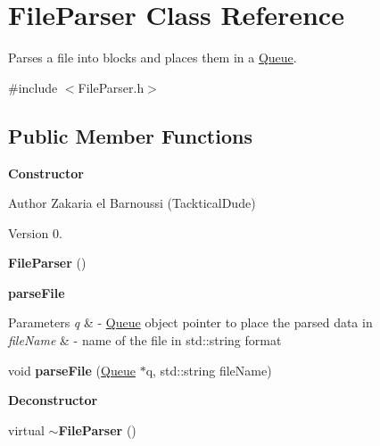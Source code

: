 \hypertarget{class_file_parser}{}\section{File\+Parser Class Reference}
\label{class_file_parser}


Parses a file into blocks and places them in a \hyperlink{class_queue}{Queue}.  




{\ttfamily \#include $<$File\+Parser.\+h$>$}

\subsection*{Public Member Functions}
\begin{Indent}{\bf Constructor}\par
{\em \begin{DoxyAuthor}{Author}
Zakaria el Barnoussi (Tacktical\+Dude) 
\end{DoxyAuthor}
\begin{DoxyVersion}{Version}
0. 
\end{DoxyVersion}
}\begin{DoxyCompactItemize}
\item 
\hypertarget{class_file_parser_acb58172b4650cd8015d5e8cad7d29647}{}{\bfseries File\+Parser} ()\label{class_file_parser_acb58172b4650cd8015d5e8cad7d29647}

\end{DoxyCompactItemize}
\end{Indent}
\begin{Indent}{\bf parse\+File}\par
{\em 
\begin{DoxyParams}{Parameters}
{\em q} & -\/ \hyperlink{class_queue}{Queue} object pointer to place the parsed data in \\
\hline
{\em file\+Name} & -\/ name of the file in std\+::string format \\
\hline
\end{DoxyParams}
}\begin{DoxyCompactItemize}
\item 
\hypertarget{class_file_parser_a07eec02b89d7a3d0cf7e5ea699917df6}{}void {\bfseries parse\+File} (\hyperlink{class_queue}{Queue} $\ast$q, std\+::string file\+Name)\label{class_file_parser_a07eec02b89d7a3d0cf7e5ea699917df6}

\end{DoxyCompactItemize}
\end{Indent}
\begin{Indent}{\bf Deconstructor}\par
\begin{DoxyCompactItemize}
\item 
\hypertarget{class_file_parser_a8b41aca52b30e9f357f50e76f3c9cc9d}{}virtual {\bfseries $\sim$\+File\+Parser} ()\label{class_file_parser_a8b41aca52b30e9f357f50e76f3c9cc9d}

\end{DoxyCompactItemize}
\end{Indent}


